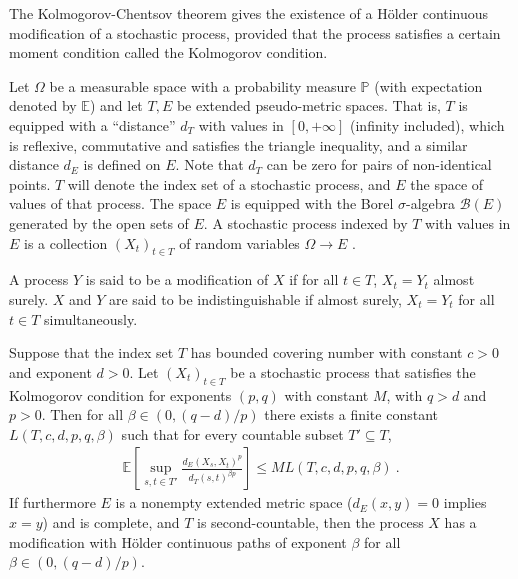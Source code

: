 \documentclass[lean]{Draft}
\begin{document}
The Kolmogorov-Chentsov theorem gives the existence of a Hölder continuous modification of a stochastic process, provided that the process satisfies a certain moment condition called the Kolmogorov condition.

\cite{kratschmer2023kolmogorov}

Let $\Omega$ be a measurable space with a probability measure $\mathbb{P}$ (with expectation denoted by $\mathbb{E}$) and let $T, E$ be extended pseudo-metric spaces.
That is, $T$ is equipped with a ``distance'' $d_T$ with values in $[0,+\infty]$ (infinity included), which is reflexive, commutative and satisfies the triangle inequality, and a similar distance $d_E$ is defined on $E$. Note that $d_T$ can be zero for pairs of non-identical points.
$T$ will denote the index set of a stochastic process, and $E$ the space of values of that process.
The space $E$ is equipped with the Borel $\sigma$-algebra $\mathcal{B}(E)$ generated by the open sets of $E$.
A stochastic process indexed by $T$ with values in $E$ is a collection $(X_t)_{t \in T}$ of random variables $\Omega \to E$ .

A process $Y$ is said to be a modification of $X$ if for all $t \in T$, $X_t = Y_t$ almost surely.
$X$ and $Y$ are said to be indistinguishable if almost surely, $X_t = Y_t$ for all $t \in T$ simultaneously.


\begin{theorem}\label{thm:kolmogorov_chentsov}
Suppose that the index set $T$ has bounded covering number with constant $c>0$ and exponent $d > 0$.
Let $(X_t)_{t \in T}$ be a stochastic process that satisfies the Kolmogorov condition for exponents $(p,q)$ with constant $M$, with $q > d$ and $p > 0$.
Then for all $\beta \in(0, (q - d)/p)$ there exists a finite constant $L(T, c, d, p, q, \beta)$ such that for every countable subset $T' \subseteq T$,
\begin{align*}
  \mathbb{E}\left[ \sup_{s, t \in T'} \frac{d_E(X_s, X_t)^p}{d_T(s, t)^{\beta p}} \right]
  \le M L(T, c, d, p, q, \beta)
  \: .
\end{align*}
If furthermore $E$ is a nonempty extended metric space ($d_E(x,y) = 0$ implies $x = y$) and is complete, and $T$ is second-countable, then the process $X$ has a modification with Hölder continuous paths of exponent $\beta$ for all $\beta \in (0, (q - d)/p)$.
\end{theorem}
\end{document}
